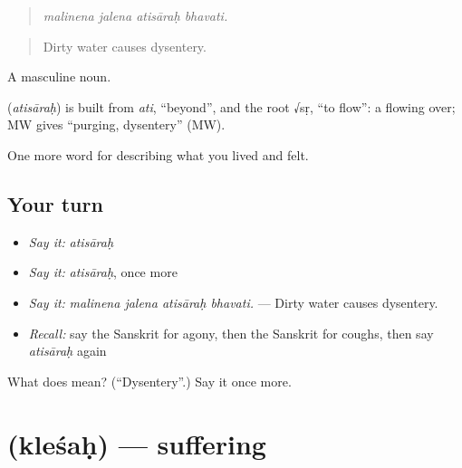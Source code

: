 \begin{quote}
   
\end{quote}

\begin{quote}
\emph{malinena jalena atisāraḥ bhavati.}
\end{quote}

\begin{quote}
Dirty water causes dysentery.
\end{quote}

A masculine noun.

\begin{cousinweb}
\textbf{} (\emph{atisāraḥ}) is built from \emph{ati}, \textquotedblleft{}beyond\textquotedblright{}, and the root √sṛ, \textquotedblleft{}to flow\textquotedblright{}: a flowing over; MW gives \textquotedblleft{}purging, dysentery\textquotedblright{} (MW).
\end{cousinweb}

\begin{grammarlens}[title={What you've built}]
One more word for describing what you lived and felt.
\end{grammarlens}

\subsection*{Your turn}
\begin{itemize}
\raggedright
  \item \emph{Say it:} \emph{atisāraḥ}
  \item \emph{Say it:} \emph{atisāraḥ}, once more
  \item \emph{Say it:} \emph{malinena jalena atisāraḥ bhavati.} — Dirty water causes dysentery.
  \item \emph{Recall:} say the Sanskrit for agony, then the Sanskrit for coughs, then say \emph{atisāraḥ} again
\end{itemize}

\begin{tcolorbox}[breakable,colback=teal!4,colframe=teal!35!black,title={Before you move on}]
What does  mean? (\textquotedblleft{}Dysentery\textquotedblright{}.) Say it once more.
\end{tcolorbox}
\section[\texorpdfstring{\sk{क्लेशः} (kleśaḥ)}{क्लेशः (kleśaḥ)}]{ (kleśaḥ) — suffering}

